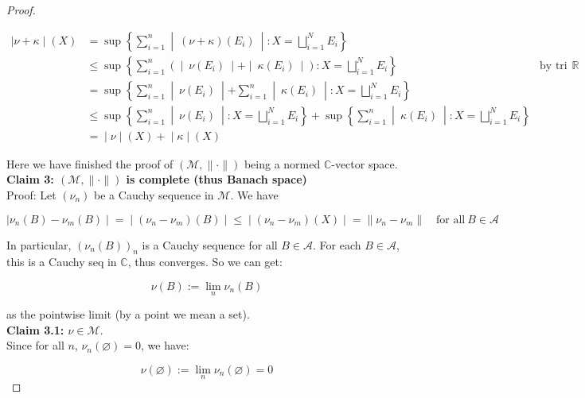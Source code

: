 \documentclass{qlnotes-export}
\begin{document}
\begin{proof}
\begin{itemize}
  \[\begin{matrix}
  \left. |\nu + \kappa \middle| (X) \right. & {= \sup\left\{ \sum\limits_{i = 1}^{n} \middle| \ (\nu + \kappa)(E_{i})\  \middle| :X = \bigsqcup\limits_{i = 1}^{N}E_{i} \right\}} & \\
   & {\leq \sup\left\{ \sum\limits_{i = 1}^{n}( \middle| \ \nu(E_{i})\  \middle| + \middle| \ \kappa(E_{i})\  \middle| ):X = \bigsqcup\limits_{i = 1}^{N}E_{i} \right\}\quad} & {\text{by tri ineq in}\ {\mathbb{R}}} \\
   & {= \sup\left\{ \sum\limits_{i = 1}^{n} \middle| \ \nu(E_{i})\  \middle| + \sum\limits_{i = 1}^{n} \middle| \ \kappa(E_{i})\  \middle| :X = \bigsqcup\limits_{i = 1}^{N}E_{i} \right\}} & \\
   & {\leq \sup\left\{ \sum\limits_{i = 1}^{n} \middle| \ \nu(E_{i})\  \middle| :X = \bigsqcup\limits_{i = 1}^{N}E_{i} \right\} + \sup\left\{ \sum\limits_{i = 1}^{n} \middle| \ \kappa(E_{i})\  \middle| :X = \bigsqcup\limits_{i = 1}^{N}E_{i} \right\}} & \\
   & \left. = \middle| \nu \middle| (X) + \middle| \kappa \middle| (X) \right. &
  \end{matrix}\]
\end{itemize}

Here we have finished the proof of \((\mathcal{M}, \parallel \cdot \parallel )\) being a normed \(\mathbb{C}\)-vector space.\\
\textbf{Claim 3: \((\mathcal{M}, \parallel \cdot \parallel )\) is complete (thus Banach space)}\\
Proof: Let \((\nu_{n})\) be a Cauchy sequence in \(\mathcal{M}\). We have

\[\left. |\nu_{n}(B) - \nu_{m}(B) \middle| = \middle| (\nu_{n} - \nu_{m})(B) \middle| \leq \middle| (\nu_{n} - \nu_{m})(X) \middle| = \parallel \nu_{n} - \nu_{m} \parallel \quad\text{for all}\ B \in \mathcal{A} \right.\]

In particular, \((\nu_{n}(B))_{n}\) is a Cauchy sequence for all \(B \in \mathcal{A}\). For each \(B \in \mathcal{A}\), this is a Cauchy seq in \(\mathbb{C}\), thus converges. So we can get:

\[\nu(B) := \lim\limits_{n}\nu_{n}(B)\]

as the pointwise limit (by a point we mean a set).\\
\textbf{Claim 3.1: \(\nu \in \mathcal{M}\)}.\\
Since for all \(n\), \(\nu_{n}(\varnothing) = 0\), we have:

\[\nu(\varnothing) := \lim\limits_{n}\nu_{n}(\varnothing) = 0\]


\end{proof}
\end{document}
